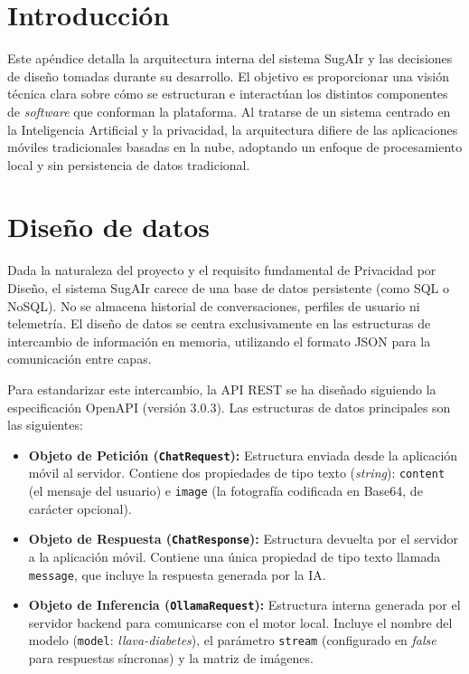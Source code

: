 
\section{Introducción}
Este apéndice detalla la arquitectura interna del sistema SugAIr y las decisiones de diseño tomadas durante su desarrollo. El objetivo es proporcionar una visión técnica clara sobre cómo se estructuran e interactúan los distintos componentes de \textit{software} que conforman la plataforma. Al tratarse de un sistema centrado en la Inteligencia Artificial y la privacidad, la arquitectura difiere de las aplicaciones móviles tradicionales basadas en la nube, adoptando un enfoque de procesamiento local y sin persistencia de datos tradicional.

\section{Diseño de datos}
Dada la naturaleza del proyecto y el requisito fundamental de Privacidad por Diseño, el sistema SugAIr carece de una base de datos persistente (como SQL o NoSQL). No se almacena historial de conversaciones, perfiles de usuario ni telemetría. El diseño de datos se centra exclusivamente en las estructuras de intercambio de información en memoria, utilizando el formato JSON para la comunicación entre capas.

Para estandarizar este intercambio, la API REST se ha diseñado siguiendo la especificación OpenAPI (versión 3.0.3). Las estructuras de datos principales son las siguientes:

\begin{itemize}
    \item \textbf{Objeto de Petición (\texttt{ChatRequest}):} Estructura enviada desde la aplicación móvil al servidor. Contiene dos propiedades de tipo texto (\textit{string}): \texttt{content} (el mensaje del usuario) e \texttt{image} (la fotografía codificada en Base64, de carácter opcional).
    \item \textbf{Objeto de Respuesta (\texttt{ChatResponse}):} Estructura devuelta por el servidor a la aplicación móvil. Contiene una única propiedad de tipo texto llamada \texttt{message}, que incluye la respuesta generada por la IA.
    \item \textbf{Objeto de Inferencia (\texttt{OllamaRequest}):} Estructura interna generada por el servidor backend para comunicarse con el motor local. Incluye el nombre del modelo (\texttt{model}: \textit{llava-diabetes}), el parámetro \texttt{stream} (configurado en \textit{false} para respuestas síncronas) y la matriz de imágenes.
\end{itemize}

